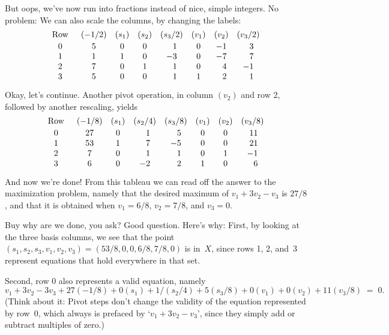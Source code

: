 \fi

But oops, we've now run into fractions instead of nice, simple integers.
No problem: We can also scale the columns, by changing the labels:
$$\def\\{\phantom-}
\vcenter{\halign{\hfil$#$\hfil\enspace&&\quad\hfil$#$\hfil\cr
\rm Row&(-1/2)&(s_1)&(s_2)&(s_3/2)&(v_1)&(v_2)&(v_3/2)\cr
\noalign{\vskip2pt}
0&5&0&0&\\1&0&-1&\\3\cr
1&1&1&0&-3&0&-7&\\7\cr
2&7&0&1&\\1&0&\\4&-1\cr
3&5&0&0&\\1&1&\\2&\\1\cr}}$$

\fi

Okay, let's continue.
Another pivot operation, in column $(v_2)$ and row 2, followed by
another rescaling, yields
$$\def\\{\phantom-}
\vcenter{\halign{\hfil$#$\hfil\enspace&&\quad\hfil$#$\hfil\cr
\rm Row&(-1/8)&(s_1)&(s_2/4)&(s_3/8)&(v_1)&(v_2)&(v_3/8)\cr
\noalign{\vskip2pt}
0&27&0&\\1&\\5&0&0&\\\llap11\cr
1&53&1&\\7&-5&0&0&\\\llap21\cr
2&7&0&\\1&\\1&0&1&-1\cr
3&6&0&-2&\\2&1&0&\\6\cr}}$$

\fi

And now we're done! From this tableau we can read off the answer to the
maximization problem, namely that the desired maximum of $v_1+3v_2-v_3$ is
$27/8$, and that it is obtained when $v_1=6/8$, $v_2=7/8$, and $v_3=0$.

Buy why are we done, you ask? Good question. Here's why: First, by looking at
the three basis columns, we see that the point $(s_1,s_2,s_3,v_1,v_2,v_3)=
(53/8,0,0,6/8,7/8,0)$ is in~$X$, since rows 1, 2, and~3 represent equations
that hold everywhere in that set.

Second, row 0 also represents a valid equation, namely
$$v_1+3v_2-3v_3+27(-1/8)+0(s_1)+1/(s_2/4)+5(s_3/8)+0(v_1)+0(v_2)+11(v_3/8)
\;=\;0.$$
(Think about it: Pivot steps don't change the validity of the equation
represented by row~0, which always is prefaced by `$v_1+3v_2-v_3$',
since they simply add or subtract multiples of zero.)

